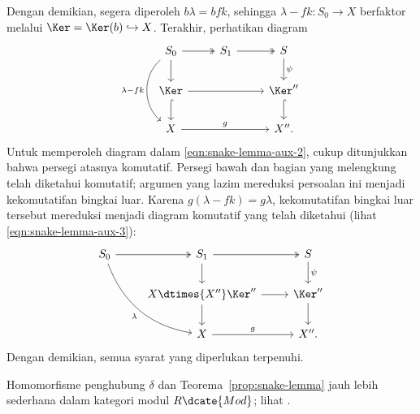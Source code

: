 \begin{bukti}
	Dengan demikian, segera diperoleh $b\lambda = bfk$, sehingga
	$\lambda - fk: S_0 \to X$ berfaktor melalui
	$\Ker = \Ker(b) \hookrightarrow X$. Terakhir, perhatikan diagram
	\[\begin{tikzcd}
		S_0 \arrow[twoheadrightarrow, r] \arrow[d] \arrow[dd, bend right=50, "{\lambda -fk}"'] & S_1 \arrow[twoheadrightarrow, r] & S \arrow[d, "\psi"] \\
		\Ker \arrow[hookrightarrow, d] \arrow[rr] & & \Ker'' \arrow[hookrightarrow, d] \\
		X \arrow[rr, "g"] & & X'' .
	\end{tikzcd}\]
	Untuk memperoleh diagram dalam
	\eqref{eqn:snake-lemma-aux-2}, cukup ditunjukkan bahwa persegi atasnya
	komutatif. Persegi bawah dan bagian yang melengkung telah diketahui
	komutatif; argumen yang lazim mereduksi persoalan ini menjadi
	kekomutatifan bingkai luar. Karena
	$g(\lambda - fk) = g\lambda$, kekomutatifan bingkai luar tersebut
	mereduksi menjadi diagram komutatif yang telah diketahui (lihat
	\eqref{eqn:snake-lemma-aux-3}):
	\[\begin{tikzcd}
		S_0 \arrow[twoheadrightarrow, r] \arrow[rdd, bend right, "\lambda"'] & S_1 \arrow[twoheadrightarrow, r] \arrow[d] & S \arrow[d, "\psi"] \\
		& X \dtimes{X''} \Ker'' \arrow[r] \arrow[d] & \Ker'' \arrow[d] \\
		& X \arrow[r, "g"] & X'' .
	\end{tikzcd}\]
	Dengan demikian, semua syarat yang diperlukan terpenuhi.
\end{bukti}

Homomorfisme penghubung $\delta$ dan Teorema~\ref{prop:snake-lemma} jauh lebih
sederhana dalam kategori modul $R\dcate{Mod}$; lihat
\cite[Proposisi 6.8.6]{Li1}.

